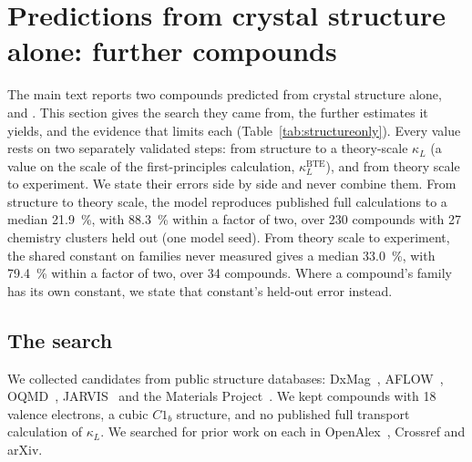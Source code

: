 \documentclass[preprint, 12pt]{elsarticle}
\begin{document}
\section{Predictions from crystal structure alone: further compounds}
\label{sec:structureonly}

The main text reports two compounds predicted from crystal structure alone,  and
. This section gives the search they came from, the further estimates it yields, and the
evidence that limits each (Table~\ref{tab:structureonly}). Every value rests on two separately
validated steps: from structure to a theory-scale $\kappa_L$ (a value on the scale of the
first-principles calculation, $\kappa_L^{\mathrm{BTE}}$), and from theory scale to experiment. We
state their errors side by side and never combine them. From structure to theory scale, the model
reproduces published full calculations to a median \SI{21.9}{\percent}, with \SI{88.3}{\percent}
within a factor of two, over \num{230} compounds with \num{27} chemistry clusters held out (one model
seed). From theory scale to experiment, the shared constant on families never measured gives a
median \SI{33.0}{\percent}, with \SI{79.4}{\percent} within a factor of two, over \num{34}
compounds. Where a compound's family has its own constant, we state that constant's held-out error
instead.

\subsection*{The search}

We collected candidates from public structure databases: DxMag~\cite{xiao2025highthroug},
AFLOW~\cite{curtarolo2012aflow}, OQMD~\cite{kirklin2015the}, JARVIS~\cite{choudhary2020the} and the
Materials Project~\cite{jain2013commentary}. We kept compounds with 18 valence electrons, a cubic
$C1_b$ structure, and no published full transport calculation of $\kappa_L$. We searched for prior
work on each in OpenAlex~\cite{priem2022openalex}, Crossref and arXiv.
\end{document}
